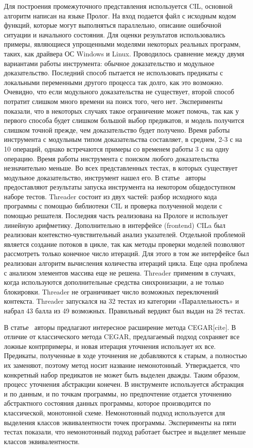 Для построения промежуточного представления используется CIL, основной алгоритм написан на языке Пролог. На вход подается файл с исходным кодом функций, которые могут выполняться параллельно, описание ошибочной ситуации и начального состояния. 
Для оценки результатов использовались примеры, являющиеся упрощенными моделями некоторых реальных программ, таких, как драйвера ОС Windows и Linux. Проводилось сравнение между двумя вариантами работы инструмента: обычное доказательство и модульное доказательство. Последний способ пытается не использовать предикаты с локальными переменными другого процесса так долго, как это возможно. Очевидно, что если модульного доказательства не существует, второй способ потратит слишком много времени на поиск того, чего нет. Эксперименты показали, что в некоторых случаях такое ограничение может помочь, так как у первого способа будет слишком большой выбор предикатов, и модель получится слишком точной прежде, чем доказательство будет получено. Время работы инструмента с модульным типом доказательства составляет, в среднем, 2-3 с на 10 операций, однако встречаются примеры со временем работы 3 с на одну операцию. Время работы инструмента с поиском любого доказательства незначительно меньше. Во всех представленных тестах, в которых существует модульное доказательство, инструмент нашел его. 
В статье~\cite{Threader:svcomp} авторы предоставляют результаты запуска инструмента на некотором общедоступном наборе тестов.
Threader состоит из двух частей: разбор исходного кода программы с помощью библиотеки CIL и проверка полученной модели с помощью решателя. Последняя часть реализована на Прологе и использует линейную арифметику.
Дополнительно в интерфейсе (frontend) CILa был реализован контекстно-чувствительный анализ указателей. Отдельной проблемой является создание потоков в цикле, так как методы проверки моделей позволяют рассмотреть только конечное число итераций. Для этого в том же интерфейсе был реализован алгоритм вычисления количества итераций цикла. Еще одна проблема с анализом элементов массива еще не решена. Threader применим в случаях, когда используются дополнительные средства синхронизации, а не только блокировки. Threader не ограничивает число возможных переключений контекста.
Threader запускался на 32 тестах из категории «Параллельность» и набрал 43 балла из 49 возможных. Правильный вердикт был выдан на 28 тестах.

В статье~\cite{Gupta:2010} авторы предлагают интересное расширение метода CEGAR[cite]. В отличие от классического метода CEGAR, предлагаемый подход сохраняет все ложные контрпримеры, и новая итерация уточнения использует их все. Предикаты, полученные в ходе уточнения не добавляются к старым, а полностью их заменяют, поэтому метод носит название немонотонный. Утверждается, что конкретный набор предикатов не может быть выделен дважды. Таким образом, процесс уточнения абстракции конечен. 
В инструменте используется абстракция и по данным, и по точкам программы, но предпочтение отдается уточнению абстрактного состояния данных программы, которое производится по классической, монотонной схеме. Немонотонный подход используется для выделения классов эквивалентности точек программы. Эксперименты на пяти тестах показали, что немонотонный подход работает быстрее и выделяет меньше классов эквивалентности.

